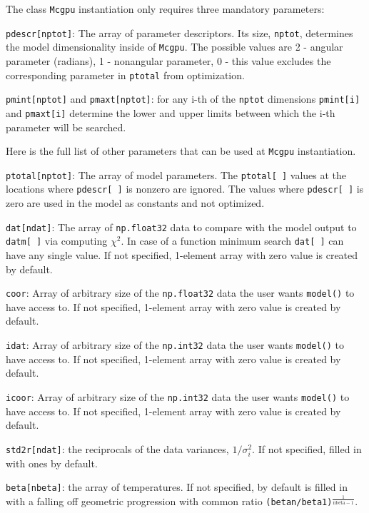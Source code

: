 \documentclass[preprint2]{aastex}
\begin{document}
The class \verb|Mcgpu| instantiation only requires three mandatory parameters:

\verb|pdescr[nptot]|: The array of parameter descriptors. Its size, \verb|nptot|,
determines the model dimensionality inside of \verb|Mcgpu|. The possible values 
are 2 - angular parameter (radians), 1 - nonangular parameter,
0 - this value excludes the corresponding parameter in \verb|ptotal| from optimization.

\verb|pmint[nptot]| and \verb|pmaxt[nptot]|: for any i-th of the \verb|nptot| dimensions
\verb|pmint[i]| and \verb|pmaxt[i]| determine the lower and upper limits between 
which the i-th parameter will be searched. 

Here is the full list of other parameters that can be used at \verb|Mcgpu| instantiation.

\verb|ptotal[nptot]|: The array of model parameters. The \verb|ptotal[ ]| values at
               the locations where \verb|pdescr[ ]| is nonzero are ignored.
               The values where \verb|pdescr[ ]| is zero are used in the model as 
               constants and not optimized.

\verb|dat[ndat]|: The array of \verb|np.float32| data to compare with the model
output to \verb|datm[ ]| via computing $\chi^2$. In case of a 
function minimum search \verb|dat[ ]| can have any single value. If not specified,
1-element array with zero value is created by default.

\verb|coor|: Array of arbitrary size of the \verb|np.float32| data the user 
wants \verb|model()| to have access to. If not specified, 1-element array with 
zero value is created by default.

\verb|idat|: Array of arbitrary size of the \verb|np.int32| data the user 
wants \verb|model()| to have access to. If not specified, 1-element array with 
zero value is created by default.

\verb|icoor|: Array of arbitrary size of the \verb|np.int32| data the user 
wants \verb|model()| to have access to. If not specified, 1-element array with 
zero value is created by default.

\verb|std2r[ndat]|: the reciprocals of the data variances, $1/\sigma^2_i$.
					If not specified, filled in with ones by default.

\verb|beta[nbeta]|: the array of temperatures. If not specified, by default is filled in 
			  with a falling off geometric progression with common ratio 
			  \verb|(betan/beta1)|$^\frac{1}{\mathrm{nbeta-1}}$.
			  
\end{document}
